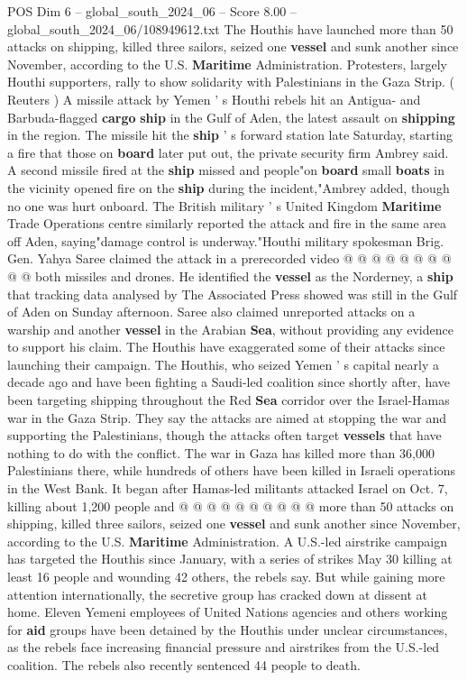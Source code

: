 \begin{textsample}{POS Dim 6 – global\_south\_2024\_06 – Score 8.00 – global\_south\_2024\_06/108949612.txt}  \label{ex:f6_pos_172}
The Houthis have launched more than 50 attacks on shipping, killed three sailors, seized one \textbf{vessel} and sunk another since November, according to the U.S. \textbf{Maritime} Administration.
Protesters, largely Houthi supporters, rally to show solidarity with Palestinians in the Gaza Strip. ( Reuters ) A missile attack by Yemen ' s Houthi rebels hit an Antigua- and Barbuda-flagged \textbf{cargo} \textbf{ship} in the Gulf of Aden, the latest assault on \textbf{shipping} in the region.
The missile hit the \textbf{ship} ' s forward station late Saturday, starting a fire that those on \textbf{board} later put out, the private security firm Ambrey said.
A second missile fired at the \textbf{ship} missed and people"on \textbf{board} small \textbf{boats} in the vicinity opened fire on the \textbf{ship} during the incident,"Ambrey added, though no one was hurt onboard.
The British military ' s United Kingdom \textbf{Maritime} Trade Operations centre similarly reported the attack and fire in the same area off Aden, saying"damage control is underway."Houthi military spokesman Brig.
Gen.
Yahya Saree claimed the attack in a prerecorded video @ @ @ @ @ @ @ @ @ @ both missiles and drones.
He identified the \textbf{vessel} as the Norderney, a \textbf{ship} that tracking data analysed by The Associated Press showed was still in the Gulf of Aden on Sunday afternoon.
Saree also claimed unreported attacks on a warship and another \textbf{vessel} in the Arabian \textbf{Sea}, without providing any evidence to support his claim.
The Houthis have exaggerated some of their attacks since launching their campaign.
The Houthis, who seized Yemen ' s capital nearly a decade ago and have been fighting a Saudi-led coalition since shortly after, have been targeting shipping throughout the Red \textbf{Sea} corridor over the Israel-Hamas war in the Gaza Strip.
They say the attacks are aimed at stopping the war and supporting the Palestinians, though the attacks often target \textbf{vessels} that have nothing to do with the conflict.
The war in Gaza has killed more than 36,000 Palestinians there, while hundreds of others have been killed in Israeli operations in the West Bank.
It began after Hamas-led militants attacked Israel on Oct. 7, killing about 1,200 people and @ @ @ @ @ @ @ @ @ @ more than 50 attacks on shipping, killed three sailors, seized one \textbf{vessel} and sunk another since November, according to the U.S. \textbf{Maritime} Administration.
A U.S.-led airstrike campaign has targeted the Houthis since January, with a series of strikes May 30 killing at least 16 people and wounding 42 others, the rebels say.
But while gaining more attention internationally, the secretive group has cracked down at dissent at home.
Eleven Yemeni employees of United Nations agencies and others working for \textbf{aid} groups have been detained by the Houthis under unclear circumstances, as the rebels face increasing financial pressure and airstrikes from the U.S.-led coalition.
The rebels also recently sentenced 44 people to death.

\end{textsample}
